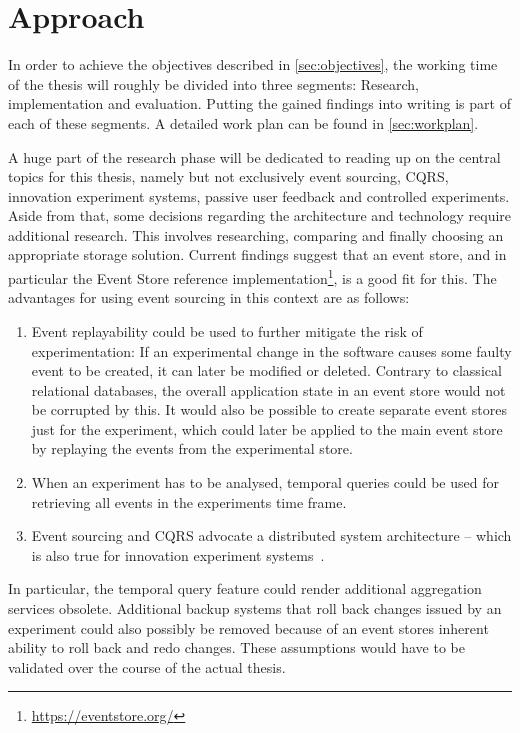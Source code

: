%
\chapter{Approach}
\label{sec:approach}

In order to achieve the objectives described in \cref{sec:objectives}, the working time of the thesis will roughly be divided into three segments: Research, implementation and evaluation.
Putting the gained findings into writing is part of each of these segments.
A detailed work plan can be found in \cref{sec:workplan}.

A huge part of the research phase will be dedicated to reading up on the central topics for this thesis, namely but not exclusively event sourcing, \ac{CQRS}, innovation experiment systems, passive user feedback and controlled experiments.
Aside from that, some decisions regarding the architecture and technology require additional research.
This involves researching, comparing and finally choosing an appropriate storage solution.
Current findings suggest that an event store, and in particular the Event Store reference implementation\footnote{\url{https://eventstore.org/}}, is a good fit for this.
The advantages for using event sourcing in this context are as follows:

\begin{enumerate}
\item Event replayability could be used to further mitigate the risk of experimentation: If an experimental change in the software causes some faulty event to be created, it can later be modified or deleted.
Contrary to classical relational databases, the overall application state in an event store would not be corrupted by this.
It would also be possible to create separate event stores just for the experiment, which could later be applied to the main event store by replaying the events from the experimental store.
\item When an experiment has to be analysed, temporal queries could be used for retrieving all events in the experiments time frame.
\item Event sourcing and \ac{CQRS} advocate a distributed system architecture -- which is also true for innovation experiment systems~\cite{ford2017building}.
\end{enumerate}

In particular, the temporal query feature could render additional aggregation services obsolete.
Additional backup systems that roll back changes issued by an experiment could also possibly be removed because of an event stores inherent ability to roll back and redo changes.
These assumptions would have to be validated over the course of the actual thesis.

